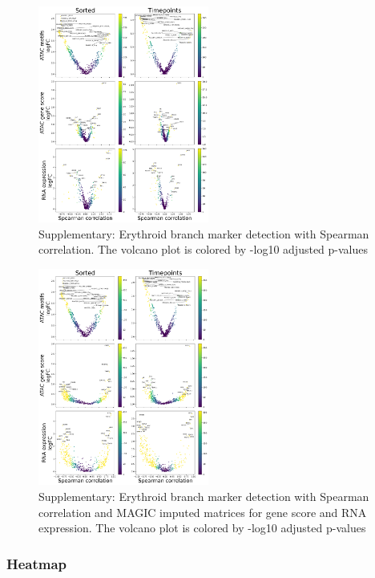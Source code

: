 \documentclass[a4paper]{article}
\begin{document}
\begin{figure}[!htb]
  \centering
  \includegraphics[width=0.5\textwidth]{../figures/hematopoiesis/Erythroid_40_103_smooth_none_single_branch_volcanos_motifs.png}
  \caption{Supplementary: Erythroid branch marker detection with Spearman correlation. The volcano plot is colored by -log10 adjusted p-values}
\end{figure}


\begin{figure}[!htb]
  \centering
  \includegraphics[width=0.5\textwidth]{../figures/hematopoiesis/Erythroid_40_103_smooth_magic_single_branch_volcanos_motifs.png}
  \caption{Supplementary: Erythroid branch marker detection with Spearman correlation and MAGIC imputed matrices for gene score and RNA expression. The volcano plot is colored by -log10 adjusted p-values}
\end{figure}

\FloatBarrier
\subsubsection{Heatmap}
\end{document}
